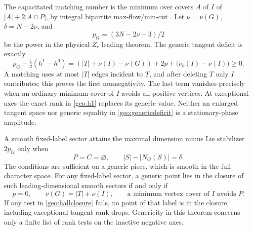 The capacitated matching number is the minimum over covers \(A\) of \(I\) of
\(|A|+2|A\cap P|\), by integral bipartite max-flow/min-cut \cite{FordFulkerson1956}. Let \(\nu=\nu(G)\), \(\delta=N-2\nu\), and
\[
                         p_G=(3N-2\nu-3)/2
\]
be the power in the physical \(Z_r\) leading theorem. The generic tangent deficit is exactly
\begin{equation}
 p_G-\tfrac12(h^1-h^0)
 = (|T|+\nu(I)-\nu(G))+2p+\bigl(\nu_b(I)-\nu(I)\bigr)\geq0.
 \label{geo:genericdeficit}
\end{equation}
A matching uses at most \(|T|\) edges incident to \(T\), and after deleting \(T\) only \(I\) contributes; this proves the first nonnegativity. The last term vanishes precisely when an ordinary minimum cover of \(I\) avoids all positive vertices. At exceptional axes the exact rank in \eqref{geo:h1} replaces its generic value. Neither an enlarged tangent space nor generic equality in \eqref{geo:genericdeficit} is a stationary-phase amplitude.

\begin{theorem}\label{geo:matching}
A smooth fixed-label sector attains the maximal dimension minus Lie stabilizer \(2p_G\) only when
\begin{equation}
 P=C=\varnothing,\qquad |S|-|N_G(S)|=\delta .
 \label{geo:hall}
\end{equation}
The conditions are sufficient on a generic piece, which is smooth in the full character space. For any fixed-label sector, a generic point lies in the closure of such leading-dimensional smooth sectors if and only if
\begin{equation}
 p=0,\qquad \nu(G)=|T|+\nu(I),\qquad
 \text{a minimum vertex cover of \(I\) avoids \(P\)}.
 \label{geo:hallclosure}
\end{equation}
If any test in \eqref{geo:hallclosure} fails, no point of that label is in the closure, including exceptional tangent rank drops. Genericity in this theorem concerns only a finite list of rank tests on the inactive negative axes.
\end{theorem}

